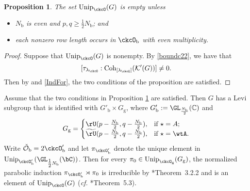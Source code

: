 \documentclass[12pt,a4paper]{amsart}
\newcommand{\CK}{{\mathcal {K}}}
\newcommand{\CO}{{\mathcal {O}}}
\newcommand{\oU}{\operatorname{U}}
\numberwithin{equation}{section}
\newtheorem{prop}[thm]{Proposition}
\theoremstyle{remark}
\def\half{{\tfrac{1}{2}}}
\def\cf{\emph{cf.} }
\def\Unip{\mathrm{Unip}}
\def\lamck{\lambda_\ckcO}
\def\Cint#1{\Coh_{[#1]}}
\def\LC{{}^{\scriptscriptstyle L}\sC}
\def\tU{\widetilde{\rU}}
\def\Coh{\mathrm{Coh}}
\def\ckcOb{\ckcO_{\mathrm b}}
\def\ckcOpb{\ckcO'_{\mathrm b}}
\def\Gg{G_{\mathrm g}}
\begin{document}


\begin{prop} \label{propu0}
The set $\Unip_{\ckcO}(G)$ is empty  unless           \begin{itemize}
            \item $N_{\mathrm b}$ is even and $p,q \geq \half N_{\mathrm b}$; and
            \item each nonzero row length occurs in $\ckcOb$ with even multiplicity.
          \end{itemize}
\end{prop}

\begin{proof} 
  Suppose that  $\Unip_{\ckcO}(G)$ is nonempty. By \eqref{boundc22}, we have that
  \[
  [\tau_{\lamck}:\Cint{\lamck}(\CK'(G))]\ne 0.
  \]
  Then  by  and \eqref{IndFor}, the two conditions of the proposition are satisfied.  
  \end{proof}

Assume that the two conditions in Proposition \ref{propu0} are satisfied. Then $G$ has a Levi subgroup that is identified with $G'_{\mathrm b}\times G_{\mathrm g}$, where 
$G'_{\mathrm b}:=\GL_{\frac{N_{\mathrm b}}{2}}(\C)$ and 
\[
  G_{\mathrm g} =
  \begin{cases}
    \rU(p-\frac{N_{\mathrm b}}{2},q-\frac{N_{\mathrm b}}{2}),  & \text{if }\star = A;\\
    \tU(p-\frac{N_{\mathrm b}}{2},q-\frac{N_{\mathrm b}}{2}),  & \text{if }\star = \wtA.
\end{cases}
\]
Write $\check \CO_{\mathrm b}=2 \ckcOpb$ and let $\pi_{\ckcOpb}$ denote the
unique element in $\Unip_{\ckcOpb}(\GL_{\half N_{\mathrm b}}(\bC))$. Then for
every $\pi_0\in \Unip_{\ckcO_{\mathrm g}}(\Gg)$, the normalized parabolic
induction $\pi_{\ckcOpb}\rtimes \pi_{0}$ is irreducible by
\cite{Mat96}*{Theorem~3.2.2} and is an element of $\Unip_{\ckcO}(G)$ (\cf
\cite{MR.U}*{Theorem~5.3}).
\end{document}
